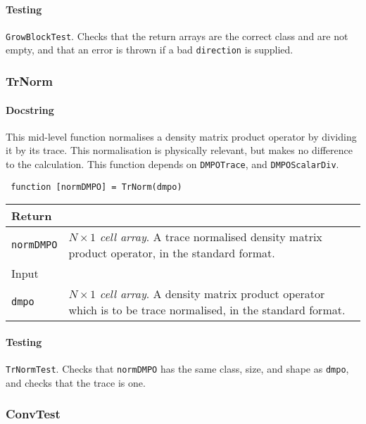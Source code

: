  \paragraph{Testing} \lstinline$GrowBlockTest$. Checks that the return arrays are the correct class and are not empty, and that an error is thrown if a bad \lstinline$direction$ is supplied.
 
 \subsubsection{TrNorm}
 \paragraph{Docstring} This mid-level function normalises a density matrix product operator by dividing it by its trace. This normalisation is physically relevant, but makes no difference to the calculation. This function depends on \lstinline$DMPOTrace$, and \lstinline$DMPOScalarDiv$.
 \begin{lstlisting}
 function [normDMPO] = TrNorm(dmpo) \end{lstlisting}
 \begin{longtabu}{X[1,l]X[4,l]}
 \hline
 Return & \\ \hline
 \lstinline$normDMPO$ & \emph{\(N \times 1\) cell array}. A trace normalised density matrix product operator, in the standard format. \\ \hline
 Input & \\ \hline
 \lstinline$dmpo$ & \emph{\(N \times 1\) cell array}. A density matrix product operator which is to be trace normalised, in the standard format. \\
 \hline
 \end{longtabu}
 \paragraph{Testing} \lstinline$TrNormTest$. Checks that \lstinline$normDMPO$ has the same class, size, and shape as \lstinline$dmpo$, and checks that the trace is one.
 
 \subsubsection{ConvTest}
